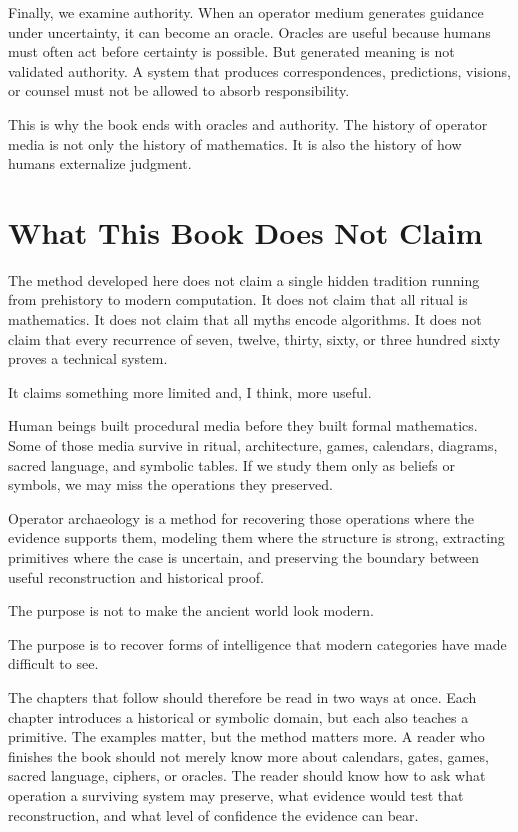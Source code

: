 \documentclass[11pt]{book}
\begin{document}
Finally, we examine authority. When an operator medium generates guidance under uncertainty, it can become an oracle. Oracles are useful because humans must often act before certainty is possible. But generated meaning is not validated authority. A system that produces correspondences, predictions, visions, or counsel must not be allowed to absorb responsibility.

This is why the book ends with oracles and authority. The history of operator media is not only the history of mathematics. It is also the history of how humans externalize judgment.

\section{What This Book Does Not Claim}

The method developed here does not claim a single hidden tradition running from prehistory to modern computation. It does not claim that all ritual is mathematics. It does not claim that all myths encode algorithms. It does not claim that every recurrence of seven, twelve, thirty, sixty, or three hundred sixty proves a technical system.

It claims something more limited and, I think, more useful.

Human beings built procedural media before they built formal mathematics. Some of those media survive in ritual, architecture, games, calendars, diagrams, sacred language, and symbolic tables. If we study them only as beliefs or symbols, we may miss the operations they preserved.

Operator archaeology is a method for recovering those operations where the evidence supports them, modeling them where the structure is strong, extracting primitives where the case is uncertain, and preserving the boundary between useful reconstruction and historical proof.

The purpose is not to make the ancient world look modern.

The purpose is to recover forms of intelligence that modern categories have made difficult to see.

The chapters that follow should therefore be read in two ways at once. Each chapter introduces a historical or symbolic domain, but each also teaches a primitive. The examples matter, but the method matters more. A reader who finishes the book should not merely know more about calendars, gates, games, sacred language, ciphers, or oracles. The reader should know how to ask what operation a surviving system may preserve, what evidence would test that reconstruction, and what level of confidence the evidence can bear.
\end{document}
